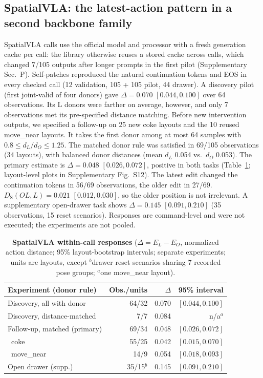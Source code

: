 \subsection{SpatialVLA: the latest-action pattern in a second backbone family}
\label{sec:svlares}
SpatialVLA calls use the official model and processor with a fresh generation cache per call: the library otherwise reuses a stored cache across calls, which changed 7/105 outputs after longer prompts in the first pilot (Supplementary Sec.~P). Self-patches reproduced the natural continuation tokens and EOS in every checked call (12 validation, 105 + 105 pilot, 44 drawer). A discovery pilot (first joint-valid of four donors) gave $\Delta=0.070$ $[0.044,0.100]$ over 64 observations. Its L donors were farther on average, however, and only 7 observations met its pre-specified distance matching. Before new intervention outputs, we specified a follow-up on 25 new coke layouts and the 10 reused move\_near layouts. It takes the first donor among at most 64 samples with $0.8\le d_L/d_O\le1.25$. The matched donor rule was satisfied in 69/105 observations (34 layouts), with balanced donor distances (mean $d_L$ 0.054 vs.\ $d_O$ 0.053). The primary estimate is $\Delta=0.048$ $[0.026,0.072]$, positive in both tasks (Table~\ref{tab:svla}; layout-level plots in Supplementary Fig.~S12). The latest edit changed the continuation tokens in 56/69 observations, the older edit in 27/69. $D_{\mathrm S}(OL,L)=0.021$ $[0.012,0.030]$, so the older position is not irrelevant. A supplementary open-drawer task shows $\Delta=0.145$ $[0.091,0.210]$ (35 observations, 15 reset scenarios). Responses are command-level and were not executed; the experiments are not pooled.

\begin{table}[t]
\centering\small
\caption{\textbf{SpatialVLA within-call responses} ($\Delta=E_L-E_O$, normalized action distance; 95\% layout-bootstrap intervals; separate experiments; units are layouts, except $^{b}$drawer reset scenarios sharing 7 recorded pose groups; $^{a}$one move\_near layout).}
\label{tab:svla}
\footnotesize\setlength{\tabcolsep}{2.5pt}
\begin{tabular}{@{}lrrr@{}}\toprule
Experiment (donor rule) & Obs./units & $\Delta$ & 95\% interval\\\midrule
Discovery, all with donor & 64/32 & 0.070 & $[0.044,0.100]$\\
Discovery, distance-matched & 7/7 & 0.084 & n/a$^{a}$\\
Follow-up, matched (primary) & 69/34 & 0.048 & $[0.026,0.072]$\\
\ coke & 55/25 & 0.042 & $[0.015,0.070]$\\
\ move\_near & 14/9 & 0.054 & $[0.018,0.093]$\\
Open drawer (supp.) & 35/15$^{b}$ & 0.145 & $[0.091,0.210]$\\\bottomrule
\end{tabular}
\end{table}



